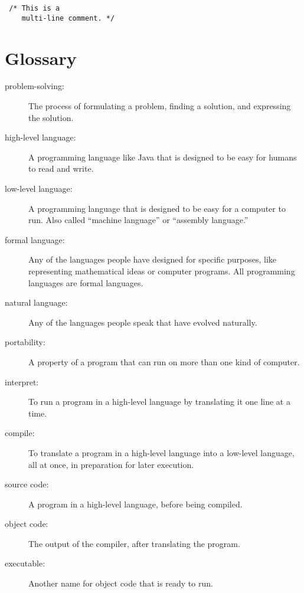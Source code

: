 \documentclass[12pt]{book}
\theoremstyle{definition}
\begin{document}
\begin{lstlisting}
 /* This is a
    multi-line comment. */
\end{lstlisting}

\section{Glossary}

\begin{description}

\item[problem-solving:]  The process of formulating a problem, finding
a solution, and expressing the solution.

\item[high-level language:]  A programming language like Java that
is designed to be easy for humans to read and write.

\item[low-level language:]  A programming language that is designed
to be easy for a computer to run.  Also called ``machine
language'' or ``assembly language.''

\item[formal language:]  Any of the languages people have designed
for specific purposes, like representing mathematical ideas or
computer programs.  All programming languages are formal languages.

\item[natural language:]  Any of the languages people speak that
have evolved naturally.

\item[portability:]  A property of a program that can run on more
than one kind of computer.

\item[interpret:]  To run a program in a high-level language
by translating it one line at a time.

\item[compile:]  To translate a program in a high-level language
into a low-level language, all at once, in preparation for later
execution.

\item[source code:]  A program in a high-level language, before
being compiled.

\item[object code:]  The output of the compiler, after translating
the program.

\item[executable:]  Another name for object code that is ready
to run.


\end{description}
\end{document}
